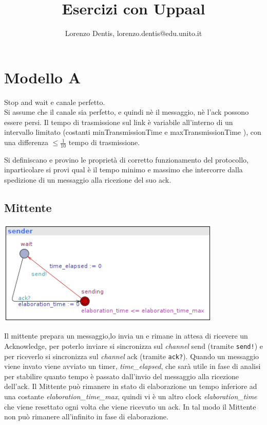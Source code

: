 \documentclass[a4paper]{article}
\newcommand{\channel}{\textit{channel }}
\begin{document}
\author{Lorenzo Dentis, lorenzo.dentis@edu.unito.it}
\title{Esercizi con Uppaal}
\maketitle
\section{Modello A}
Stop and wait e canale perfetto.\\ 
Si assume che il canale sia perfetto, e quindi nè il messaggio, nè l’ack possono essere persi. 
Il tempo di trasmissione sul link è variabile all’interno di un intervallo limitato (costanti minTransmissionTime e maxTransmissionTime ), con una differenza $\leq \frac{1}{10}$ tempo di trasmissione. 

Si definiscano e provino le proprietà di corretto funzionamento del protocollo, inparticolare si provi qual è il tempo minimo e massimo che intercorre dalla spedizione di un messaggio alla ricezione del suo ack.
\subsection{Mittente}
\begin{center}\includegraphics[width=0.8\textwidth]{1_sender.png}\end{center}
Il mittente prepara un messaggio,lo invia un e rimane in attesa di ricevere un Acknowledge, per poterlo inviare si sincronizza sul \channel send (tramite \texttt{send!}) e per riceverlo si sincronizza sul \channel ack (tramite \texttt{ack?}).
Quando un messaggio viene invato viene avviato un timer, \textit{time\_elapsed}, che sarà utile in fase di analisi per stabilire quanto tempo è passato dall'invio del messaggio alla ricezione dell'ack.
Il Mittente può rimanere in stato di elaborazione un tempo inferiore ad una costante \textit{elaboration\_time\_max}, quindi vi è un altro clock \textit{elaboration\_time} che viene resettato ogni volta che viene ricevuto un ack.
In tal modo il Mittente non può rimanere all'infinito in fase di elaborazione.
\end{document}
